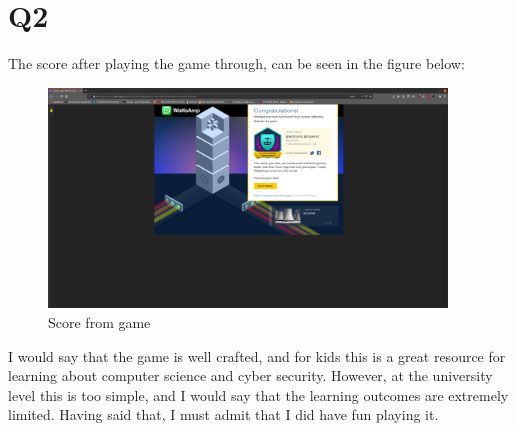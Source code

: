 \documentclass{article}
\begin{document}
\section{Q2}

The score after playing the game through, can be seen in the figure below:
\begin{figure}[H]
 \centering
  \includegraphics[width=300pt]{img/game.png}
 \caption{Score from game}
 \end{figure}

I would say that the game is well crafted, and for kids this is a great resource for learning about computer science and cyber security. However, at the university level this is too simple, and I would say that the learning outcomes are extremely limited. Having said that, I must admit that I did have fun playing it.

\end{document}
